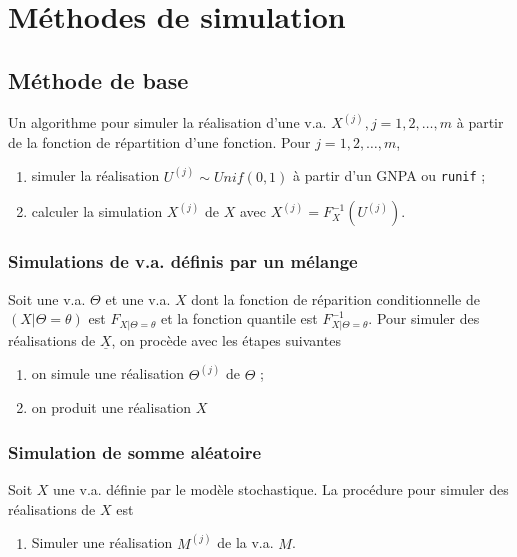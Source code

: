 \chapter{Méthodes de simulation}

\section{Méthode de base}

Un algorithme pour simuler la réalisation d'une v.a. $X^{(j)}, j = 1, 2, \dots, m$ à partir de la fonction de répartition d'une fonction. Pour $j = 1, 2, \dots, m$, 
\begin{enumerate}
	\item simuler la réalisation $U^{(j)} \sim Unif(0, 1)$ à partir d'un GNPA ou \texttt{runif} ;
	\item calculer la simulation $X^{(j)}$ de $X$ avec $X^{(j)} = F_{X}^{-1}\left(U^{(j)}\right)$.
\end{enumerate}

\subsection{Simulations de v.a. définis par un mélange}

Soit une v.a. $\Theta$ et une v.a. $X$ dont la fonction de réparition conditionnelle de $(X \vert \Theta = \theta)$ est $F_{X\vert \Theta = \theta}$ et la fonction quantile est $F_{X \vert \Theta = \theta}^{-1}$. Pour simuler des réalisations de $\underline{X}$, on procède avec les étapes suivantes
\begin{enumerate}
	\item on simule une réalisation $\Theta^{(j)}$ de $\Theta$ ;
	\item on produit une réalisation $X$
\end{enumerate}

\subsection{Simulation  de somme aléatoire}

Soit $X$ une v.a. définie par le modèle stochastique. La procédure pour simuler des réalisations de $X$ est 
\begin{enumerate}
	\item Simuler une réalisation $M^{(j)}$ de la v.a. $M$. 
\end{enumerate}





































